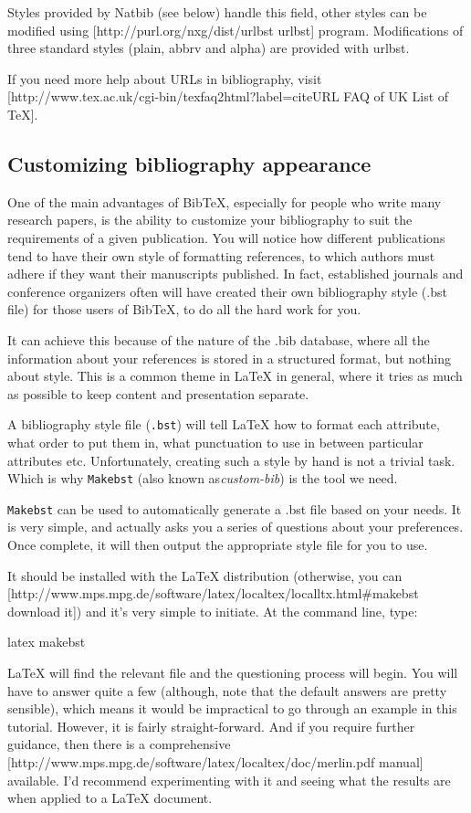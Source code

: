 Styles provided by Natbib (see below) handle this field, other styles can be
modified using [http://purl.org/nxg/dist/urlbst urlbst] program. Modifications
of three standard styles (plain, abbrv and alpha) are provided with urlbst.

If you need more help about URLs in bibliography, visit
[http://www.tex.ac.uk/cgi-bin/texfaq2html?label=citeURL FAQ of UK List of TeX].

\subsection{Customizing bibliography appearance}
One of the main advantages of BibTeX, especially for people who write many
research papers, is the ability to customize your bibliography to suit the
requirements of a given publication. You will notice how different publications
tend to have their own style of formatting references, to which authors must
adhere if they want their manuscripts published. In fact, established journals
and conference organizers often will have created their own bibliography style
(.bst file) for those users of BibTeX, to do all the hard work for you.

It can achieve this because of the nature of the .bib database, where all the
information about your references is stored in a structured format, but nothing
about style. This is a common theme in LaTeX in general, where it tries as much
as possible to keep content and presentation separate.

A bibliography style file (\verb|.bst|) will tell LaTeX how to format each
attribute, what order to put them in, what punctuation to use in between
particular attributes etc. Unfortunately, creating such a style by hand is not
a trivial task. Which is why \verb|Makebst| (also known as\textit{custom-bib})
is the tool we need.

\verb|Makebst| can be used to automatically generate a .bst file based on your
needs. It is very simple, and actually asks you a series of questions about
your preferences. Once complete, it will then output the appropriate style file
for you to use.

It should be installed with the LaTeX distribution (otherwise, you can
[http://www.mps.mpg.de/software/latex/localtex/localltx.html\#makebst download
it]) and it's very simple to initiate. At the command line, type:

 latex makebst

LaTeX will find the relevant file and the questioning process will begin. You
will have to answer quite a few (although, note that the default answers are
pretty sensible), which means it would be impractical to go through an example
in this tutorial. However, it is fairly straight-forward. And if you require
further guidance, then there is a comprehensive
[http://www.mps.mpg.de/software/latex/localtex/doc/merlin.pdf manual]
available. I'd recommend experimenting with it and seeing what the results are
when applied to a LaTeX document.

